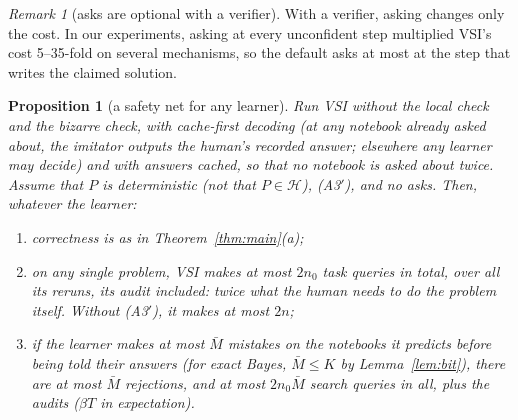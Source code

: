 \documentclass[11pt]{article}
\newtheorem{proposition}[theorem]{Proposition}
\theoremstyle{definition}
\theoremstyle{remark}
\newtheorem{remark}[theorem]{Remark}
\newcommand{\K}{K}
\newcommand{\Hyp}{\mathcal{H}}
\begin{document}
\begin{remark}[asks are optional with a verifier]
With a verifier, asking changes only the cost. In our experiments, asking at every unconfident step multiplied VSI's cost 5--35-fold on several mechanisms, so the default asks at most at the step that writes the claimed solution.
\end{remark}

\begin{proposition}[a safety net for any learner]\label{prop:any-learner}
Run VSI without the local check and the bizarre check, with \emph{cache-first decoding} (at any notebook already asked about, the imitator outputs the human's recorded answer; elsewhere any learner may decide) and with answers cached, so that no notebook is asked about twice. Assume that $P$ is deterministic (not that $P\in\Hyp$), (A3$'$), and no asks. Then, whatever the learner:
\begin{enumerate}[label=(\alph*),nosep]
\item correctness is as in Theorem~\ref{thm:main}(a);
\item on any single problem, VSI makes at most $2n_0$ task queries in total, over all its reruns, its audit included: twice what the human needs to do the problem itself. Without (A3$'$), it makes at most $2n$;
\item if the learner makes at most $\bar M$ mistakes on the notebooks it predicts before being told their answers (for exact Bayes, $\bar M\le\K$ by Lemma~\ref{lem:bit}), there are at most $\bar M$ rejections, and at most $2n_0\bar M$ search queries in all, plus the audits ($\beta T$ in expectation).
\end{enumerate}
\end{proposition}
\end{document}
